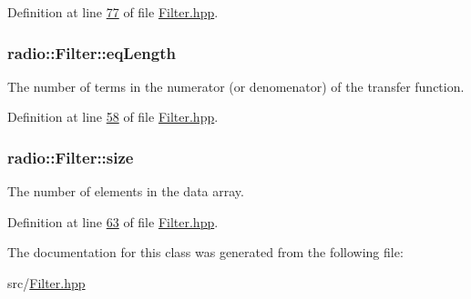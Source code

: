 Definition at line \hyperlink{Filter_8hpp_source_l00077}{77} of file \hyperlink{Filter_8hpp_source}{Filter.\+hpp}.

\hypertarget{classradio_1_1Filter_a26a32320c4dffa8925ab5f0f06689e8d}{
\subsubsection[{eq\+Length}]{ radio\+::\+Filter\+::eq\+Length\hspace{0.3cm}{\ttfamily [protected]}}}\label{classradio_1_1Filter_a26a32320c4dffa8925ab5f0f06689e8d}
The number of terms in the numerator (or denomenator) of the transfer function. 

Definition at line \hyperlink{Filter_8hpp_source_l00058}{58} of file \hyperlink{Filter_8hpp_source}{Filter.\+hpp}.

\hypertarget{classradio_1_1Filter_a7285b4c7263d8278e38abb14b5dca5d9}{
\subsubsection[{size}]{ radio\+::\+Filter\+::size\hspace{0.3cm}{\ttfamily [protected]}}}\label{classradio_1_1Filter_a7285b4c7263d8278e38abb14b5dca5d9}
The number of elements in the data array. 

Definition at line \hyperlink{Filter_8hpp_source_l00063}{63} of file \hyperlink{Filter_8hpp_source}{Filter.\+hpp}.



The documentation for this class was generated from the following file\+:\begin{DoxyCompactItemize}
\item 
src/\hyperlink{Filter_8hpp}{Filter.\+hpp}\end{DoxyCompactItemize}
